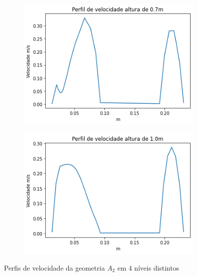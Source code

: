 \begin{figure}[H]
\begin{subfigure}[b]{0.42\linewidth}
    	\end{subfigure}
    	\\
    	\begin{subfigure}[b]{0.42\linewidth}
    		\includegraphics[width=\linewidth]{img/perfil_vel/liso/perfil_velocidade_liso_s_700.png}
    	\end{subfigure}
    	\begin{subfigure}[b]{0.42\linewidth}
    		\includegraphics[width=\linewidth]{img/perfil_vel/liso/perfil_velocidade_liso_s_1000.png}
    	\end{subfigure}
    	\caption{Perfis de velocidade da geometria $A_2$ em 4 níveis distintos}
    	\label{fig:perfil_velocidade_liso_standoff}
\end{figure}
    
